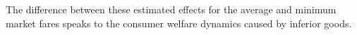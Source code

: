 \documentclass{article}
\begin{document}
    The difference between these estimated effects for the average and minimum market fares speaks to the consumer welfare dynamics caused by inferior goods. 
    
	
	
	
\end{document}
